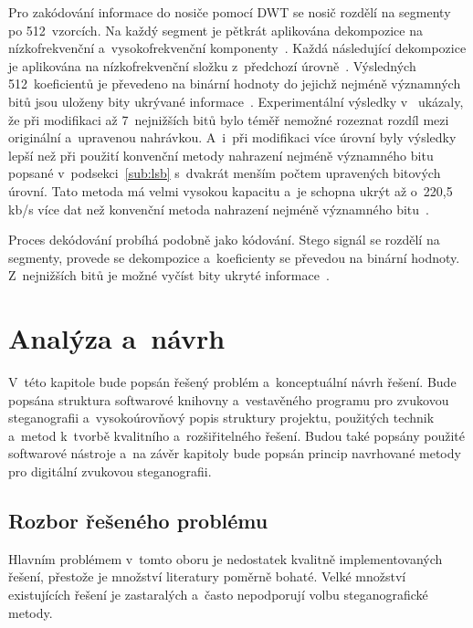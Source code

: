 Pro zakódování informace do nosiče pomocí DWT se nosič rozdělí na segmenty po
512~vzorcích. Na každý segment je pětkrát aplikována dekompozice na
nízkofrekvenční a~vysokofrekvenční komponenty~\cite{Cvejic2002Wavelet}. Každá
následující dekompozice je aplikována na nízkofrekvenční složku z~předchozí
úrovně~\cite{Prabakaran2012}. Výsledných 512~koeficientů je převedeno na
binární hodnoty do jejichž nejméně významných bitů jsou uloženy bity ukrývané
informace~\cite{Cvejic2002Wavelet}. Experimentální výsledky
v~\cite{Cvejic2002Wavelet} ukázaly, že při modifikaci až 7~nejnižších bitů bylo
téměř nemožné rozeznat rozdíl mezi originální a~upravenou nahrávkou. A~i~při
modifikaci více úrovní byly výsledky lepší než při použití konvenční metody
nahrazení nejméně významného bitu popsané v~podsekci~\ref{sub:lsb} s~dvakrát
menším počtem upravených bitových úrovní. Tato metoda má velmi vysokou kapacitu
a~je schopna ukrýt až o~220,5\,kb/s více dat než konvenční metoda nahrazení
nejméně významného bitu~\cite{Cvejic2002Wavelet}.

Proces dekódování probíhá podobně jako kódování. Stego signál se rozdělí na
segmenty, provede se dekompozice a~koeficienty se převedou na binární hodnoty.
Z~nejnižších bitů je možné vyčíst bity ukryté informace~\cite{Pooyan2007}.


\chapter{Analýza a~návrh}
\label{cha:library-design}

V~této kapitole bude popsán řešený problém a~konceptuální návrh řešení. Bude
popsána struktura softwarové knihovny a~vestavěného programu pro zvukovou
steganografii a~vysokoúrovňový popis struktury projektu, použitých technik
a~metod k~tvorbě kvalitního a~rozšiřitelného řešení. Budou také popsány použité
softwarové nástroje a~na závěr kapitoly bude popsán princip navrhované metody
pro digitální zvukovou steganografii.

\section{Rozbor řešeného problému}
\label{sec:problem-analysis}

Hlavním problémem v~tomto oboru je nedostatek kvalitně implementovaných řešení,
přestože je množství literatury poměrně bohaté. Velké množství existujících
řešení je zastaralých a~často nepodporují volbu steganografické metody.


